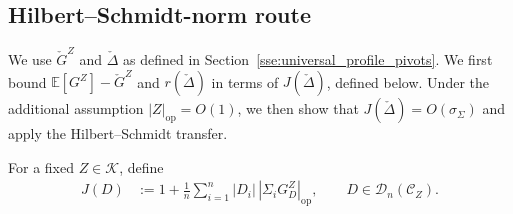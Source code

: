 \documentclass[EJP, preprint, NODS, nobera, nofontexpansion]{ejpecp}
\DeclareMathOperator{\op}{op}
\begin{document}
\subsection{Hilbert--Schmidt-norm route}
\label{sse:hs_profile_route}
\label{sse:limited_second_moment_profiles}

We use \(\check G^Z\) and \(\check\Delta\) as defined in
Section~\ref{sse:universal_profile_pivots}.
We first bound \(\mathbb E[G^Z]-\check G^Z\) and
\(r(\check\Delta)\) in terms of \(J(\check\Delta)\), defined below.
Under the additional assumption \(|Z|_{\op}=O(1)\), we then show that
\(J(\check\Delta)=O(\sigma_\Sigma)\) and apply the Hilbert--Schmidt transfer.

For a fixed $Z\in\mathcal K$,
define
\begin{align}\label{eq:def_matrix_check_pivot_interaction}
    J(D)
    &:={}
    1+\frac1n\sum_{i=1}^n
    |D_i|\,|\Sigma_iG_D^Z|_{\op},
    \qquad D\in\mathcal D_n(\mathcal C_Z).
\end{align}
\end{document}

